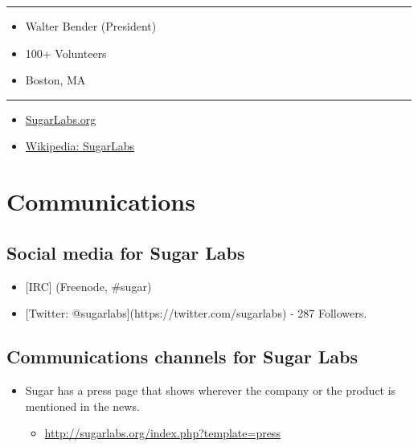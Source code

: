 \begin{center}\rule{3in}{0.4pt}\end{center}

\begin{itemize}
\itemsep1pt\parskip0pt
\item
  Walter Bender (President)
\item
  100+ Volunteers
\item
  Boston, MA
\end{itemize}

\begin{center}\rule{3in}{0.4pt}\end{center}

\begin{itemize}
\itemsep1pt\parskip0pt
\item
  \href{http://sugarlabs.org}{SugarLabs.org}
\item
  \href{http://en.wikipedia.org/wiki/Sugar_Labs}{Wikipedia: SugarLabs}
\end{itemize}

\section{Communications}\label{communications}

\subsection{Social media for Sugar
Labs}\label{social-media-for-sugar-labs}

\begin{itemize}
\itemsep1pt\parskip0pt
\item
  {[}IRC{]} (Freenode, \#sugar)
\item
  {[}Twitter: @sugarlabs{]}(https://twitter.com/sugarlabs) - 287
  Followers.
\end{itemize}

\subsection{Communications channels for Sugar
Labs}\label{communications-channels-for-sugar-labs}

\begin{itemize}
\itemsep1pt\parskip0pt
\item
  Sugar has a press page that shows wherever the company or the product
  is mentioned in the news.

  \begin{itemize}
  \itemsep1pt\parskip0pt
  \item
    \url{http://sugarlabs.org/index.php?template=press}
  \end{itemize}
\end{itemize}


